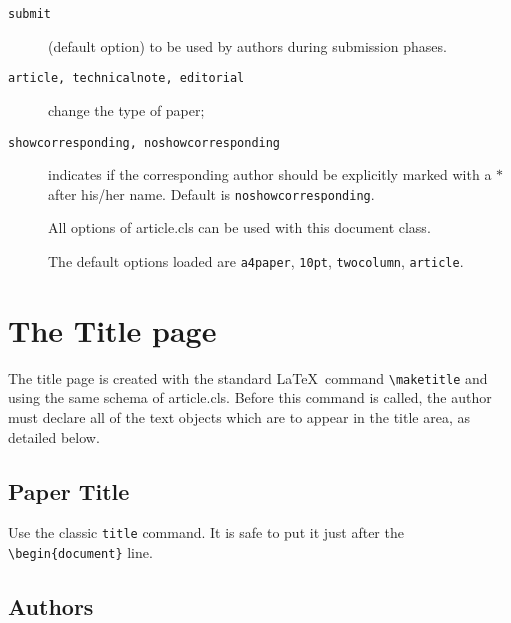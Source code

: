 \documentclass[10pt,onecolumn]{imeko_acta}
\def\file#1{\textsf{\fontsize{9.1}{9.5}\selectfont#1}\xspace}
\begin{document}
\begin{description}

\item [{\tt submit}]  (default option) to be used by authors during submission phases.


\item [{\tt article, technicalnote, editorial}]  change the type of paper;

\item [{\tt showcorresponding, noshowcorresponding}] indicates if the corresponding author should be explicitly marked with a $\ast$ after his/her name. Default is \verb|noshowcorresponding|.



\item[] All options of \file{article.cls} can be used with this
  document class.

\item[] The default options loaded are \verb+a4paper+, \verb+10pt+,
  \verb+twocolumn+, \verb+article+.

\end{description}

\section{The Title page}

The title page is created with the standard \LaTeX\ command \verb|\maketitle| and using the same schema of article.cls.
Before this command is called, the author must declare all of the text objects which are to appear in the title area, as detailed below.

\subsection{Paper Title} \label{sec:sub1}

Use the classic \verb|title| command. It is safe to put it just after the \verb|\begin{document}| line.

\subsection{Authors}
\end{document}
